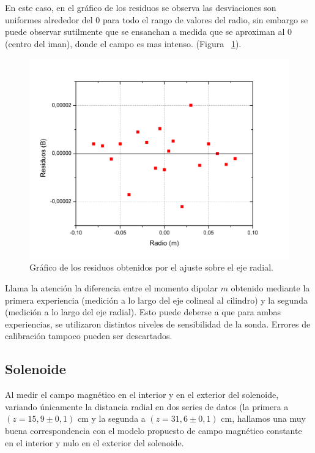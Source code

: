 \documentclass[12pt]{article}
\begin{document}
En este caso, en el gr\'afico de los residuos se observa las desviaciones son uniformes alrededor del 0 para todo el rango de valores del radio, sin embargo se puede observar sutilmente que se ensanchan a medida que se aproximan al 0 (centro del iman), donde el campo es mas intenso. (Figura ~\ref{fig:residuos_iman_radio}).

\begin{figure}[H]
\centering
\includegraphics[scale=0.5]{residuos_iman_radio.jpg}
\caption{Gr\'afico de los residuos obtenidos por el ajuste sobre el eje radial.}
\label{fig:residuos_iman_radio}
\end{figure}

Llama la atención la diferencia entre el momento dipolar $m$ obtenido mediante la primera experiencia (medición a lo largo del eje colineal al cilindro) y la segunda (medición a lo largo del eje radial). Esto puede deberse a que para ambas experiencias, se utilizaron distintos niveles de sensibilidad de la sonda. Errores de calibración tampoco pueden ser descartados.


\subsection{Solenoide}

Al medir el campo magnético en el interior y en el exterior del solenoide, variando únicamente la distancia radial en dos series de datos (la primera a $(z=15,9 \pm 0,1)$ cm y la segunda a $(z=31,6 \pm 0,1)$ cm, hallamos una muy buena correspondencia con el modelo propuesto de campo magnético constante en el interior y nulo en el exterior del solenoide.\\ 
\end{document}
